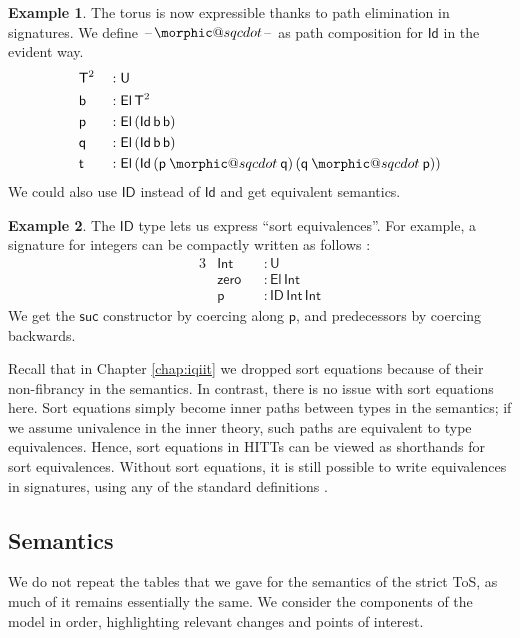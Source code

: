 \documentclass[12pt,a4paper,twoside,openany]{book}
\makeatletter
\DeclareRobustCommand{\sqcdot}{\mathbin{\mathpalette\morphic@sqcdot\relax}}
\newcommand{\morphic@sqcdot}[2]{%
  \sbox\z@{$\m@th#1\centerdot$}%
  \ht\z@=.33333\ht\z@
  \vcenter{\box\z@}%
}
\theoremstyle{remark}
\theoremstyle{definition}
\newtheorem{myexample}{Example}
\theoremstyle{theorem}
\newcommand{\ms}[1]{\mathsf{#1}}
\newcommand{\zero}{\ms{zero}}
\newcommand{\suc}{\ms{suc}}
\newcommand{\U}{\mathsf{U}}
\newcommand{\El}{\mathsf{El}}
\newcommand{\Id}{\mathsf{Id}}
\newcommand{\ID}{\mathsf{ID}}
\newcommand{\blank}{\mathord{\hspace{1pt}\text{--}\hspace{1pt}}}
\newcommand{\p}{\mathsf{p}}
\newcommand{\q}{\mathsf{q}}
\makeatother
\begin{document}
\begin{myexample}
The torus is now expressible thanks to path elimination in signatures. We define
$\blank\!\sqcdot\!\blank$ as path composition for $\Id$ in the evident way.
\begin{alignat*}{3}
  &\ms{T}^2  &&: \U\\
  &\ms{b}    &&: \El\,\ms{T}^2\\
  &\ms{p}    &&: \El\,(\Id\,\ms{b}\,\ms{b})\\
  &\ms{q}    &&: \El\,(\Id\,\ms{b}\,\ms{b})\\
  &\ms{t}    &&: \El\,(\Id\,(\p \sqcdot \q)\,(\q \sqcdot \p))
\end{alignat*}
We could also use $\ID$ instead of $\Id$ and get equivalent semantics.
\end{myexample}

\begin{myexample}
The $\ID$ type lets us express ``sort equivalences''. For example, a signature
for integers can be compactly written as follows \cite{hit-integers}:
\begin{alignat*}{3}
  &\ms{Int}  &&: \U\\
  &\zero     &&: \El\,\ms{Int}\\
  &\p        &&: \ID\,\ms{Int}\,\ms{Int}
\end{alignat*}
We get the $\suc$ constructor by coercing along $\p$, and predecessors by
coercing backwards.


Recall that in Chapter \ref{chap:iqiit} we dropped sort equations because of
their non-fibrancy in the semantics. In contrast, there is no issue with sort
equations here. Sort equations simply become inner paths between types in the
semantics; if we assume univalence in the inner theory, such paths are
equivalent to type equivalences. Hence, sort equations in HITTs can be viewed as
shorthands for sort equivalences. Without sort equations, it is still possible
to write equivalences in signatures, using any of the standard definitions
\cite[Chapter~4]{hottbook}.
\end{myexample}

\subsection{Semantics}

We do not repeat the tables that we gave for the semantics of the strict ToS, as
much of it remains essentially the same. We consider the components of the model
in order, highlighting relevant changes and points of interest.
\end{document}
